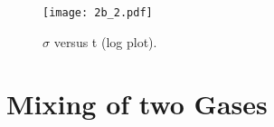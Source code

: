 \documentclass{article}
\begin{document}
\begin{figure}
\centering
\texttt{[image: 2b\_2.pdf]}
\caption{$\sigma$ versus t (log plot).}
\label{sigma}
\end{figure}

\section{Mixing of two Gases}
\end{document}
